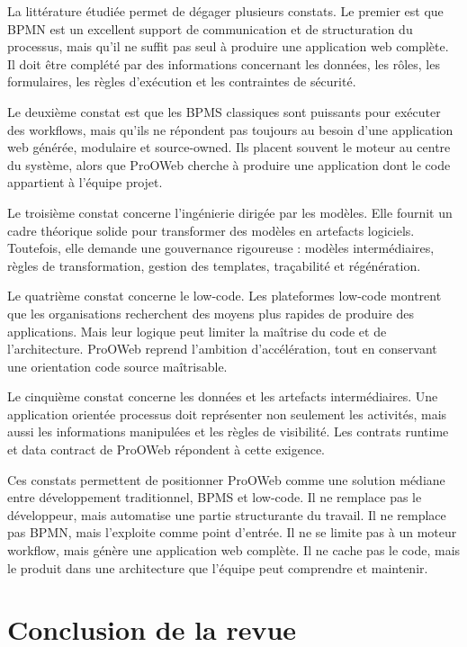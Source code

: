 \documentclass[12pt,a4paper]{article}
\begin{document}
La littérature étudiée permet de dégager plusieurs constats. Le premier est que BPMN est un excellent support de communication et de structuration du processus, mais qu'il ne suffit pas seul à produire une application web complète. Il doit être complété par des informations concernant les données, les rôles, les formulaires, les règles d'exécution et les contraintes de sécurité.

Le deuxième constat est que les BPMS classiques sont puissants pour exécuter des workflows, mais qu'ils ne répondent pas toujours au besoin d'une application web générée, modulaire et source-owned. Ils placent souvent le moteur au centre du système, alors que ProOWeb cherche à produire une application dont le code appartient à l'équipe projet.

Le troisième constat concerne l'ingénierie dirigée par les modèles. Elle fournit un cadre théorique solide pour transformer des modèles en artefacts logiciels. Toutefois, elle demande une gouvernance rigoureuse : modèles intermédiaires, règles de transformation, gestion des templates, traçabilité et régénération.

Le quatrième constat concerne le low-code. Les plateformes low-code montrent que les organisations recherchent des moyens plus rapides de produire des applications. Mais leur logique peut limiter la maîtrise du code et de l'architecture. ProOWeb reprend l'ambition d'accélération, tout en conservant une orientation code source maîtrisable.

Le cinquième constat concerne les données et les artefacts intermédiaires. Une application orientée processus doit représenter non seulement les activités, mais aussi les informations manipulées et les règles de visibilité. Les contrats runtime et data contract de ProOWeb répondent à cette exigence.

Ces constats permettent de positionner ProOWeb comme une solution médiane entre développement traditionnel, BPMS et low-code. Il ne remplace pas le développeur, mais automatise une partie structurante du travail. Il ne remplace pas BPMN, mais l'exploite comme point d'entrée. Il ne se limite pas à un moteur workflow, mais génère une application web complète. Il ne cache pas le code, mais le produit dans une architecture que l'équipe peut comprendre et maintenir.

\section{Conclusion de la revue}
\end{document}
